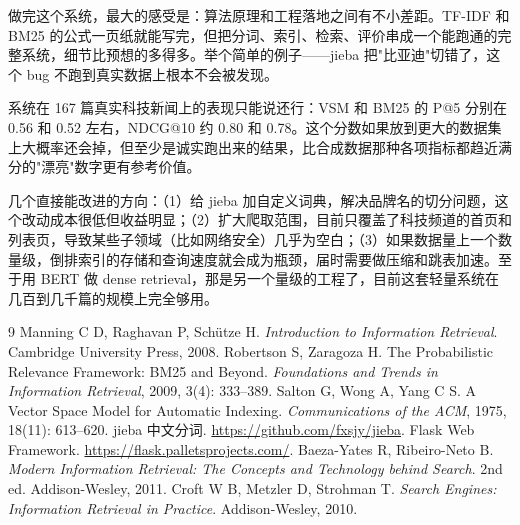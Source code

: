 \documentclass[12pt, a4paper]{ctexart}
\begin{document}
做完这个系统，最大的感受是：算法原理和工程落地之间有不小差距。TF-IDF 和 BM25 的公式一页纸就能写完，但把分词、索引、检索、评价串成一个能跑通的完整系统，细节比预想的多得多。举个简单的例子——jieba 把"比亚迪"切错了，这个 bug 不跑到真实数据上根本不会被发现。

系统在 167 篇真实科技新闻上的表现只能说还行：VSM 和 BM25 的 P@5 分别在 0.56 和 0.52 左右，NDCG@10 约 0.80 和 0.78。这个分数如果放到更大的数据集上大概率还会掉，但至少是诚实跑出来的结果，比合成数据那种各项指标都趋近满分的"漂亮"数字更有参考价值。

几个直接能改进的方向：（1）给 jieba 加自定义词典，解决品牌名的切分问题，这个改动成本很低但收益明显；（2）扩大爬取范围，目前只覆盖了科技频道的首页和列表页，导致某些子领域（比如网络安全）几乎为空白；（3）如果数据量上一个数量级，倒排索引的存储和查询速度就会成为瓶颈，届时需要做压缩和跳表加速。至于用 BERT 做 dense retrieval，那是另一个量级的工程了，目前这套轻量系统在几百到几千篇的规模上完全够用。


\begin{thebibliography}{9}
    Manning C D, Raghavan P, Schütze H.
    \textit{Introduction to Information Retrieval}.
    Cambridge University Press, 2008.
    Robertson S, Zaragoza H.
    The Probabilistic Relevance Framework: BM25 and Beyond.
    \textit{Foundations and Trends in Information Retrieval},
    2009, 3(4): 333--389.
    Salton G, Wong A, Yang C S.
    A Vector Space Model for Automatic Indexing.
    \textit{Communications of the ACM},
    1975, 18(11): 613--620.
    jieba 中文分词.
    \url{https://github.com/fxsjy/jieba}.
    Flask Web Framework.
    \url{https://flask.palletsprojects.com/}.
    Baeza-Yates R, Ribeiro-Neto B.
    \textit{Modern Information Retrieval: The Concepts and Technology behind Search}.
    2nd ed. Addison-Wesley, 2011.
    Croft W B, Metzler D, Strohman T.
    \textit{Search Engines: Information Retrieval in Practice}.
    Addison-Wesley, 2010.
\end{thebibliography}
\end{document}
